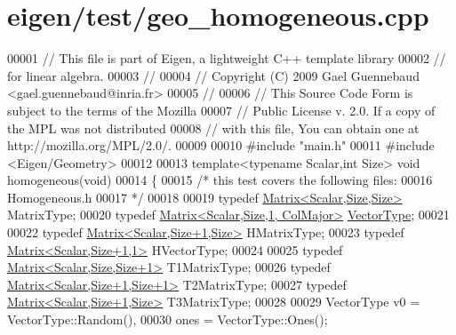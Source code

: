 \hypertarget{eigen_2test_2geo__homogeneous_8cpp_source}{}\section{eigen/test/geo\+\_\+homogeneous.cpp}
\label{eigen_2test_2geo__homogeneous_8cpp_source}

\begin{DoxyCode}
00001 \textcolor{comment}{// This file is part of Eigen, a lightweight C++ template library}
00002 \textcolor{comment}{// for linear algebra.}
00003 \textcolor{comment}{//}
00004 \textcolor{comment}{// Copyright (C) 2009 Gael Guennebaud <gael.guennebaud@inria.fr>}
00005 \textcolor{comment}{//}
00006 \textcolor{comment}{// This Source Code Form is subject to the terms of the Mozilla}
00007 \textcolor{comment}{// Public License v. 2.0. If a copy of the MPL was not distributed}
00008 \textcolor{comment}{// with this file, You can obtain one at http://mozilla.org/MPL/2.0/.}
00009 
00010 \textcolor{preprocessor}{#include "main.h"}
00011 \textcolor{preprocessor}{#include <Eigen/Geometry>}
00012 
00013 \textcolor{keyword}{template}<\textcolor{keyword}{typename} Scalar,\textcolor{keywordtype}{int} Size> \textcolor{keywordtype}{void} homogeneous(\textcolor{keywordtype}{void})
00014 \{
00015   \textcolor{comment}{/* this test covers the following files:}
00016 \textcolor{comment}{     Homogeneous.h}
00017 \textcolor{comment}{  */}
00018 
00019   \textcolor{keyword}{typedef} \hyperlink{group___core___module_class_eigen_1_1_matrix}{Matrix<Scalar,Size,Size>} MatrixType;
00020   \textcolor{keyword}{typedef} \hyperlink{group___core___module_class_eigen_1_1_matrix}{Matrix<Scalar,Size,1, ColMajor>} 
      \hyperlink{struct_vector_type}{VectorType};
00021 
00022   \textcolor{keyword}{typedef} \hyperlink{group___core___module_class_eigen_1_1_matrix}{Matrix<Scalar,Size+1,Size>} HMatrixType;
00023   \textcolor{keyword}{typedef} \hyperlink{group___core___module_class_eigen_1_1_matrix}{Matrix<Scalar,Size+1,1>} HVectorType;
00024 
00025   \textcolor{keyword}{typedef} \hyperlink{group___core___module_class_eigen_1_1_matrix}{Matrix<Scalar,Size,Size+1>}   T1MatrixType;
00026   \textcolor{keyword}{typedef} \hyperlink{group___core___module_class_eigen_1_1_matrix}{Matrix<Scalar,Size+1,Size+1>} T2MatrixType;
00027   \textcolor{keyword}{typedef} \hyperlink{group___core___module_class_eigen_1_1_matrix}{Matrix<Scalar,Size+1,Size>} T3MatrixType;
00028 
00029   VectorType v0 = VectorType::Random(),
00030              ones = VectorType::Ones();

\end{DoxyCode}
